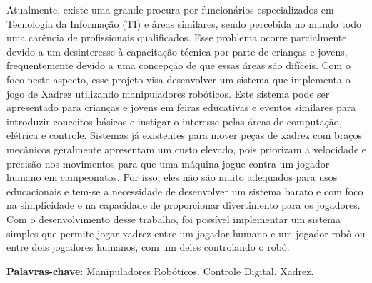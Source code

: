 



\setlength{\absparsep}{18pt} %
\begin{resumo}
  Atualmente, existe uma grande procura por funcionários especializados em Tecnologia da Informação (TI) e áreas similares, sendo percebida no mundo todo uma carência de profissionais qualificados.
  Esse problema ocorre parcialmente devido a um desinteresse à capacitação técnica por parte de crianças e jovens, frequentemente devido a uma concepção de que essas áreas são difíceis.
  Com o foco neste aspecto, esse projeto visa desenvolver um sistema que implementa o jogo de Xadrez utilizando manipuladores robóticos.
  Este sistema pode ser apresentado para crianças e jovens em feiras educativas e eventos similares para introduzir conceitos básicos e instigar o interesse pelas áreas de computação, elétrica e controle.
  Sistemas já existentes para mover peças de xadrez com braços mecânicos geralmente apresentam um custo elevado, pois priorizam a velocidade e precisão nos movimentos para que uma máquina jogue contra um jogador humano em campeonatos.
  Por isso, eles não são muito adequados para usos educacionais e tem-se a necessidade de desenvolver um sistema barato e com foco na simplicidade e na capacidade de proporcionar divertimento para os jogadores.
  Com o desenvolvimento desse trabalho, foi possível implementar um sistema simples que permite jogar xadrez entre um jogador humano e um jogador robô ou entre dois jogadores humanos, com um deles controlando o robô.
 
  \vspace{\onelineskip} 
  \noindent 
  \textbf{Palavras-chave}: Manipuladores Robóticos. Controle Digital. Xadrez.

\end{resumo}


